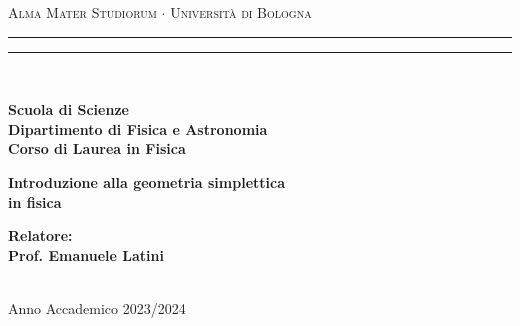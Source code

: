 \begin{titlepage}

  \frontispiceFamily
  \begin{center}
  {{\Large{\textsc{Alma Mater Studiorum $\cdot$ Università di Bologna}}}} 
  \rule[0.1cm]{\textwidth}{0.1mm}
  \rule[0.5cm]{\textwidth}{0.6mm}
  \\\vspace{3mm}
  
  {\small\textbf{ Scuola di Scienze \\ 
  Dipartimento di Fisica e Astronomia\\
  Corso di Laurea in Fisica}}
  
  \end{center}
  
  \vspace{23mm}
  
  \begin{center}{
  {\LARGE\textbf{ Introduzione alla geometria simplettica \\in fisica}}\\
  }\end{center}
  
  \vspace{50mm} \par \noindent
  
  \begin{minipage}[t]{0.47\textwidth}
  {\large\textbf{\noindent Relatore: \vspace{2mm}\\{
  Prof. Emanuele Latini}}}\\\\

  \end{minipage}
  \hfill
  \begin{minipage}[t]{0.47\textwidth}
  \end{minipage}
  
  \vspace{40mm}
  
  \begin{center}
  Anno Accademico {2023/2024}
  \end{center}
  
  \end{titlepage} 